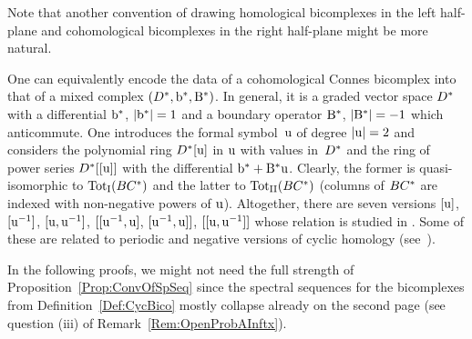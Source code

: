 \documentclass[\MainFolder/Text.tex]{subfiles}
\begin{document}
Note that another convention of drawing homological bicomplexes in the left half-plane and cohomological bicomplexes in the right half-plane might be more natural.
\begin{Remark}\label{Rem:MixedCompl}
One can equivalently encode the data of a cohomological Connes bicomplex into that of a mixed complex $(D^*,\mathrm{b}^*,\mathrm{B}^*)$. In general, it is a graded vector space $D^*$ with a differential $\mathrm{b}^*$, $|\mathrm{b}^*|=1$ and a boundary operator $\mathrm{B}^*$, $|\mathrm{B}^*|=-1$ which anticommute. One introduces the formal symbol~$\mathrm{u}$ of degree $|\mathrm{u}|= 2$ and considers the polynomial ring $D^*[\mathrm{u}]$ in $\mathrm{u}$ with values in~$D^*$ and the ring of power series $D^*[[\mathrm{u}]]$ with the differential $\mathrm{b}^* + \mathrm{B}^*\mathrm{u}$. Clearly, the former is quasi-isomorphic to ${\mathrm{Tot}_{\mathrm{I}}}(BC^{*})$ and the latter to ${\mathrm{Tot}_{\mathrm{II}}}(BC^{*})$ (columns of $BC^{*}$ are indexed with non-negative powers of $\mathrm{u}$).
Altogether, there are seven versions $[\mathrm{u}]$, $[\mathrm{u}^{-1}]$, $[\mathrm{u},\mathrm{u}^{-1}]$, $[[\mathrm{u}^{-1},\mathrm{u}]$, $[\mathrm{u}^{-1},\mathrm{u}]]$, $[[\mathrm{u},\mathrm{u}^{-1}]]$ whose relation is studied in \cite{Cieliebak2018b}. Some of these are related to periodic and negative versions of cyclic homology (see~\cite{LodayCyclic}).
\end{Remark}
In the following proofs, we might not need the full strength of Proposition~\ref{Prop:ConvOfSpSeq} since the spectral sequences for the bicomplexes from Definition~\ref{Def:CycBico} mostly collapse already on the second page (see question (iii) of Remark~\ref{Rem:OpenProbAInftx}).
\end{document}
